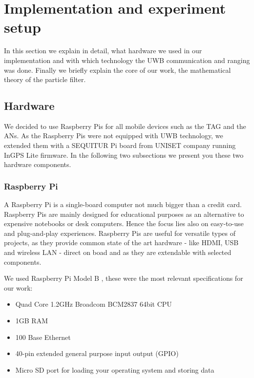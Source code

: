 
\chapter{Implementation and experiment setup} %

\label{Chapter4} %
In this section we explain in detail, what hardware we used in our implementation and with which technology the UWB communication and ranging was done. Finally we briefly explain the core of our work, the mathematical theory of the particle filter.


\section{Hardware}
We decided to use Raspberry Pis for all mobile devices such as the TAG and the ANs. As the Raspberry Pis were not equipped with UWB technology, we extended them with a SEQUITUR Pi board from UNISET company running InGPS Lite firmware. In the following two subsections we present you these two hardware components.


\subsection{Raspberry Pi}
A Raspberry Pi is a single-board computer not much bigger than a credit card. Raspberry Pis are mainly designed for educational purposes as an alternative to expensive notebooks or desk computers. Hence the focus lies also on easy-to-use and plug-and-play experiences. Raspberry Pis are useful for versatile types of projects, as they provide common state of the art hardware - like HDMI, USB and wireless LAN - direct on boad and as they are extendable with selected components.

We used Raspberry Pi Model B \cite{Raspberry}, these were the most relevant specifications for our work:
\begin{itemize}
\item Quad Core 1.2GHz Broadcom BCM2837 64bit CPU
\item 1GB RAM
\item 100 Base Ethernet
\item 40-pin extended general purpose input output (GPIO)
\item Micro SD port for loading your operating system and storing data
\end{itemize}

